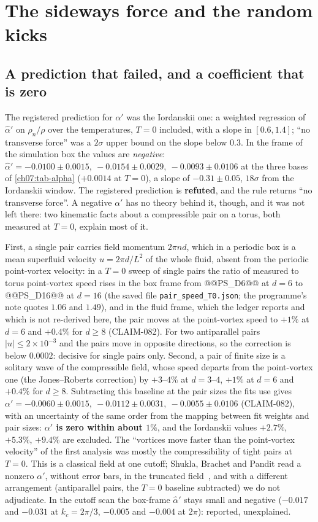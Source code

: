 
\section{The sideways force and the random kicks}\label{ch07:alphaprime}

\subsection*{A prediction that failed, and a coefficient that is zero}

The registered prediction for $\alpha'$ was the Iordanskii one: a weighted regression of $\hat\alpha'$ on $\rho_n/\rho$ over the temperatures, $T=0$ included, with a slope in $[0.6,1.4]$; ``no transverse force'' was a $2\sigma$ upper bound on the slope below $0.3$. In the frame of the simulation box the values are
\emph{negative}: $\hat\alpha'=-0.0100\pm0.0015,\ -0.0154\pm0.0029,\ -0.0093\pm0.0106$ at the three bases of \cref{ch07:tab-alpha} ($+0.0014$ at $T=0$), a slope of $-0.31\pm0.05$, $18\sigma$ from the Iordanskii window. The registered prediction is \textbf{refuted}, and the rule returns ``no transverse force''.
A negative $\alpha'$ has no theory behind it, though, and it was not left there: two kinematic facts about a compressible pair on a torus, both measured at $T=0$, explain most of it.

First, a single pair carries field momentum $2\pi nd$, which in a periodic box is a mean superfluid velocity $u=2\pi d/L^2$ of the whole fluid, absent from the periodic point-vortex velocity: in a $T=0$ sweep of single pairs the ratio of measured to torus point-vortex speed rises in the box frame from @@PS_D6@@ at $d=6$ to @@PS_D16@@ at $d=16$ (the saved file \texttt{pair\_speed\_T0.json}; the programme's note quotes $1.06$ and $1.49$), and in the fluid frame, which the ledger reports and which is not re-derived here, the pair moves at the point-vortex speed to
$+1\%$ at $d=6$ and $+0.4\%$ for $d\ge8$ (CLAIM-082). For two antiparallel pairs $|u|\le2\times10^{-3}$ and the pairs move in opposite directions, so the correction is below $0.0002$: decisive for single pairs only. Second, a pair of finite size is a solitary wave of the compressible field, whose speed departs from the point-vortex one (the Jones--Roberts correction) by $+3$--$4\%$ at $d=3$--$4$,
$+1\%$ at $d=6$ and $+0.4\%$ for $d\ge8$. Subtracting this baseline at the pair sizes the fits use gives $\alpha'=-0.0060\pm0.0015,\ -0.0112\pm0.0031,\ -0.0055\pm0.0106$ (CLAIM-082), with an uncertainty of the same order from the mapping between fit weights and pair sizes: \textbf{$\alpha'$ is zero within about $1\%$}, and the Iordanskii values $+2.7\%$, $+5.3\%$, $+9.4\%$ are excluded. The
``vortices move faster than the point-vortex velocity'' of the first analysis was mostly the compressibility of tight pairs at $T=0$. This is a classical field at one cutoff; Shukla, Brachet and Pandit read a nonzero $\alpha'$, without error bars, in the truncated field~\cite{Shukla2014}, and with a different arrangement (antiparallel pairs, the $T=0$ baseline subtracted) we do not adjudicate. In the cutoff scan the box-frame $\hat\alpha'$ stays small and negative ($-0.017$ and
$-0.031$ at $k_c=2\pi/3$, $-0.005$ and $-0.004$ at $2\pi$): reported, unexplained.

